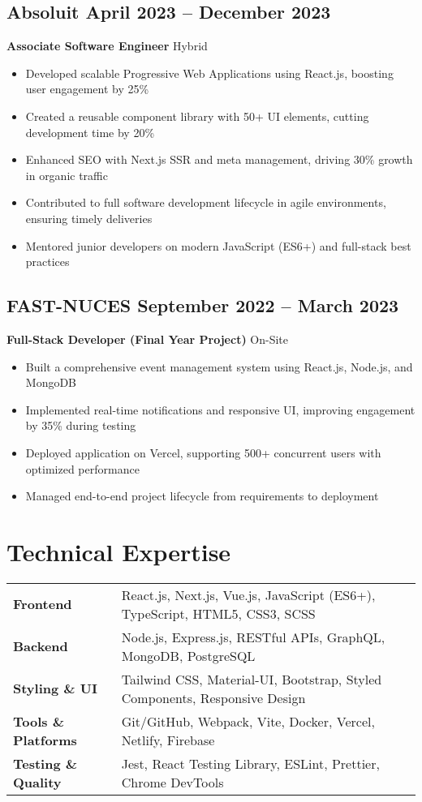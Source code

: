 \subsection{Absoluit \hfill April 2023 -- December 2023}
\textbf{Associate Software Engineer} \hfill Hybrid
\begin{itemize}
\item Developed scalable Progressive Web Applications using React.js, boosting user engagement by 25\%
\item Created a reusable component library with 50+ UI elements, cutting development time by 20\%
\item Enhanced SEO with Next.js SSR and meta management, driving 30\% growth in organic traffic
\item Contributed to full software development lifecycle in agile environments, ensuring timely deliveries
\item Mentored junior developers on modern JavaScript (ES6+) and full-stack best practices
\end{itemize}

\subsection{FAST-NUCES \hfill September 2022 -- March 2023}
\textbf{Full-Stack Developer (Final Year Project)} \hfill On-Site
\begin{itemize}
\item Built a comprehensive event management system using React.js, Node.js, and MongoDB
\item Implemented real-time notifications and responsive UI, improving engagement by 35\% during testing
\item Deployed application on Vercel, supporting 500+ concurrent users with optimized performance
\item Managed end-to-end project lifecycle from requirements to deployment
\end{itemize}

\section{Technical Expertise}
\begin{tabularx}{\textwidth}{@{} l X @{}}
\textbf{Frontend} & React.js, Next.js, Vue.js, JavaScript (ES6+), TypeScript, HTML5, CSS3, SCSS \\
\textbf{Backend} & Node.js, Express.js, RESTful APIs, GraphQL, MongoDB, PostgreSQL \\
\textbf{Styling \& UI} & Tailwind CSS, Material-UI, Bootstrap, Styled Components, Responsive Design \\
\textbf{Tools \& Platforms} & Git/GitHub, Webpack, Vite, Docker, Vercel, Netlify, Firebase \\
\textbf{Testing \& Quality} & Jest, React Testing Library, ESLint, Prettier, Chrome DevTools \\
\end{tabularx}

